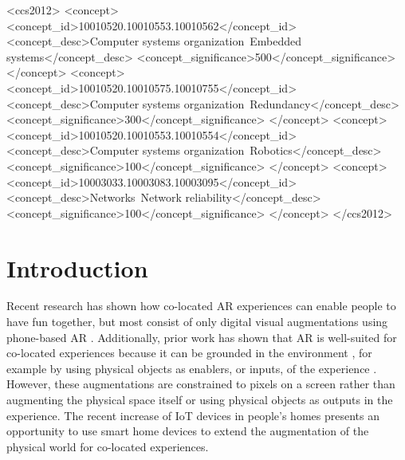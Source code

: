 \documentclass[sigconf, language=french,
language=german, language=spanish, language=english]{acmart}
\begin{document}
\begin{CCSXML}
<ccs2012>
 <concept>
  <concept_id>10010520.10010553.10010562</concept_id>
  <concept_desc>Computer systems organization~Embedded systems</concept_desc>
  <concept_significance>500</concept_significance>
 </concept>
 <concept>
  <concept_id>10010520.10010575.10010755</concept_id>
  <concept_desc>Computer systems organization~Redundancy</concept_desc>
  <concept_significance>300</concept_significance>
 </concept>
 <concept>
  <concept_id>10010520.10010553.10010554</concept_id>
  <concept_desc>Computer systems organization~Robotics</concept_desc>
  <concept_significance>100</concept_significance>
 </concept>
 <concept>
  <concept_id>10003033.10003083.10003095</concept_id>
  <concept_desc>Networks~Network reliability</concept_desc>
  <concept_significance>100</concept_significance>
 </concept>
</ccs2012>
\end{CCSXML}








\maketitle

\section{Introduction}
Recent research has shown how co-located AR experiences can
enable people to have fun together, but most consist of only digital
visual augmentations using phone-based AR \cite{dagan2022project}. Additionally, prior
work has shown that AR is well-suited for co-located experiences
because it can be grounded in the environment \cite{wetzel2008guidelines}, for example
by using physical objects as enablers, or inputs, of the experience
\cite{dagan2022project}. However, these augmentations are constrained to pixels on a
screen rather than augmenting the physical space itself or using
physical objects as outputs in the experience. The recent increase
of IoT devices in people’s homes \cite{koskela2004evolution} presents an opportunity to use
smart home devices to extend the augmentation of the physical
world for co-located experiences.
\end{document}

